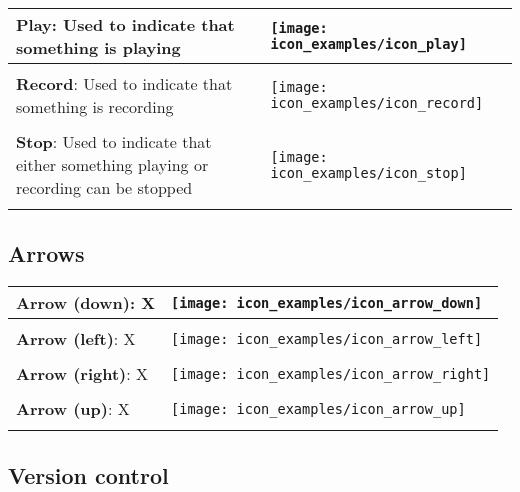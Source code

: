 \begin{longtable}{m{\textwidth-2.2cm} m{1.5cm}}
	\textbf{Play}: Used to indicate that something is playing & \parbox[c]{1.2cm}{
	\texttt{[image: icon\_examples/icon\_play]}} \\[0.6cm] \hline \\[-0.6em]

	\textbf{Record}: Used to indicate that something is recording & \parbox[c]{1.2cm}{
	\texttt{[image: icon\_examples/icon\_record]}} \\[0.6cm] \hline \\[-0.6em]

	\textbf{Stop}: Used to indicate that either something playing or recording can be stopped & \parbox[c]{1.2cm}{
	\texttt{[image: icon\_examples/icon\_stop]}} \\[0.6cm] \hline \\[-0.6em]
\end{longtable}


\subsection{Arrows}


\begin{longtable}{m{\textwidth-2.2cm} m{1.5cm}}
	\textbf{Arrow (down)}: X & \parbox[c]{1.2cm}{
	\texttt{[image: icon\_examples/icon\_arrow\_down]}} \\[0.6cm] \hline \\[-0.6em]

	\textbf{Arrow (left)}: X & \parbox[c]{1.2cm}{
	\texttt{[image: icon\_examples/icon\_arrow\_left]}} \\[0.6cm] \hline \\[-0.6em]

	\textbf{Arrow (right)}: X & \parbox[c]{1.2cm}{
	\texttt{[image: icon\_examples/icon\_arrow\_right]}} \\[0.6cm] \hline \\[-0.6em]

	\textbf{Arrow (up)}: X & \parbox[c]{1.2cm}{
	\texttt{[image: icon\_examples/icon\_arrow\_up]}} \\[0.6cm] \hline \\[-0.6em]
\end{longtable}


\subsection{Version control}

